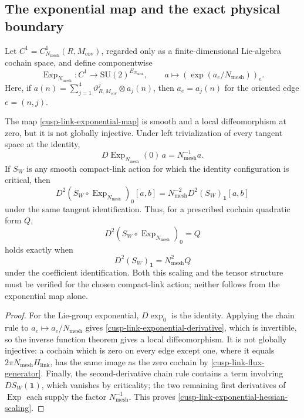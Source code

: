 \subsection{The exponential map and the exact physical boundary}

Let \(C^1=C^1_{N_{\mathrm{mesh}}}(R,M_{\mathrm{cov}})\), regarded only as a
finite-dimensional Lie-algebra cochain space, and define componentwise
\begin{equation}
 \operatorname{Exp}_{N_{\mathrm{mesh}}}:C^1
 \longrightarrow\mathrm{SU}(2)^{E_{N_{\mathrm{mesh}}}},
 \qquad
 a\longmapsto\left(\exp(a_e/N_{\mathrm{mesh}})\right)_e.
 \label{cusp-link-exponential-map}
\end{equation}
Here, if
\(a(n)=\sum_{j=1}^4\vartheta^j_{R,M_{\mathrm{cov}}}\otimes a_j(n)\),
then \(a_e=a_j(n)\) for the oriented edge \(e=(n,j)\).

\begin{proposition}
\label{cusp-link-exponential-local-only}
The map \eqref{cusp-link-exponential-map} is smooth and a local
diffeomorphism at zero, but it is not globally injective.  Under left
trivialization of every tangent space at the identity,
\begin{equation}
 D\operatorname{Exp}_{N_{\mathrm{mesh}}}(0)\,a
 =N_{\mathrm{mesh}}^{-1}a.
 \label{cusp-link-exponential-derivative}
\end{equation}
If \(S_W\) is any smooth compact-link action for which the identity
configuration is critical, then
\begin{equation}
 D^2(S_W\circ\operatorname{Exp}_{N_{\mathrm{mesh}}})_0[a,b]
 =N_{\mathrm{mesh}}^{-2}
  D^2(S_W)_{\mathbf1}[a,b]
 \label{cusp-link-exponential-hessian-scaling}
\end{equation}
under the same tangent identification.  Thus, for a prescribed cochain
quadratic form \(Q\),
\[
 D^2(S_W\circ\operatorname{Exp}_{N_{\mathrm{mesh}}})_0=Q
\]
holds exactly when
\[
 D^2(S_W)_{\mathbf1}=N_{\mathrm{mesh}}^2Q
\]
under the coefficient identification.  Both this scaling and the tensor
structure must be verified for the chosen compact-link action; neither
follows from the exponential map alone.
\end{proposition}

\begin{proof}
For the Lie-group exponential, \(D\exp_0\) is the identity.  Applying the
chain rule to \(a_e\mapsto a_e/N_{\mathrm{mesh}}\) gives
\eqref{cusp-link-exponential-derivative}, which is invertible, so the inverse
function theorem gives a local diffeomorphism.  It is not globally
injective: a cochain which is zero on every edge except one, where it equals
\(2\pi N_{\mathrm{mesh}}H_{\mathrm{link}}\), has the same image as the zero cochain by
\eqref{cusp-link-flux-generator}.  Finally, the second-derivative chain rule
contains a term involving \(DS_W(\mathbf1)\), which vanishes by criticality;
the two remaining first derivatives of \(\operatorname{Exp}\) each supply
the factor \(N_{\mathrm{mesh}}^{-1}\).  This proves
\eqref{cusp-link-exponential-hessian-scaling}.
\end{proof}

